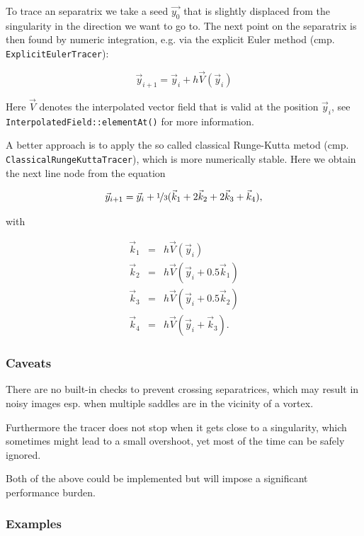 \documentclass[a4paper,10pt,notitlepage]{scrartcl}
\begin{document}
To trace an separatrix we take a seed $\vec{y_0}$ that is slightly displaced
from the singularity in the direction we want to go to. The next point on the
separatrix is then found by numeric integration, e.g. via the explicit Euler
method (cmp. \texttt{ExplicitEulerTracer}):

\begin{equation}
 \vec{y}_{i+1} = \vec{y}_i + h \vec{V}(\vec{y}_i)
\end{equation}

Here $\vec{V}$ denotes the interpolated vector field that is valid at the
position $\vec{y}_i$, see \texttt{InterpolatedField::elementAt()} for more
information.

A better approach is to apply the so called classical Runge-Kutta
metod (cmp. \texttt{ClassicalRungeKuttaTracer}), which is more numerically
stable. Here we obtain the next line node from the equation

\begin{equation}
 \vec{y}_{i+1} = \vec{y}_i + \nicefrac{1}{3} (\vec{k}_1 + 2 \vec{k}_2 + 2
\vec{k}_3 + \vec{k}_4),
\end{equation}

with

\begin{eqnarray}
 \vec{k}_1 &=& h \vec{V}(\vec{y}_i) \\
 \vec{k}_2 &=& h \vec{V}(\vec{y}_i + 0.5 \vec{k}_1) \\
 \vec{k}_3 &=& h \vec{V}(\vec{y}_i + 0.5 \vec{k}_2) \\
 \vec{k}_4 &=& h \vec{V}(\vec{y}_i + \vec{k}_3).
\end{eqnarray}

\subsubsection{Caveats}

There are no built-in checks to prevent crossing separatrices, which may result
in noisy images esp. when multiple saddles are in the vicinity of a vortex.

Furthermore the tracer does not stop when it gets close to a singularity, which
sometimes might lead to a small overshoot, yet most of the time can be safely
ignored.

Both of the above could be implemented but will impose a significant
performance burden.

\subsubsection{Examples}
\end{document}
